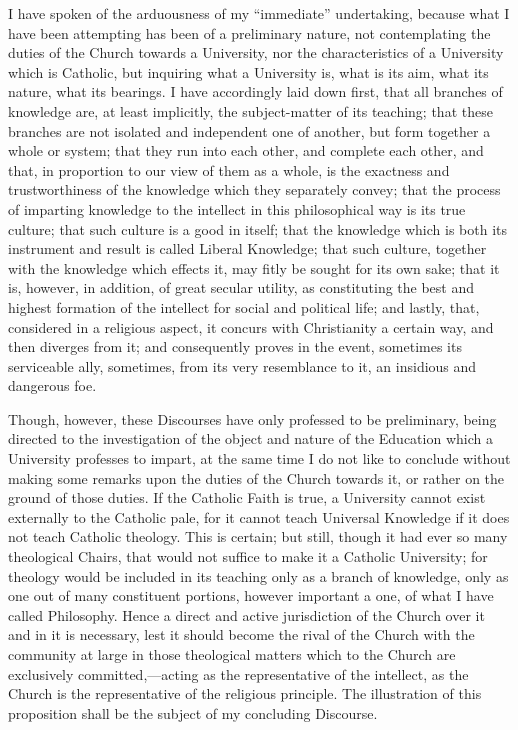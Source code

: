 I have spoken of the arduousness of my ``immediate''
undertaking, because what I have been attempting has been of a
preliminary nature, not contemplating the duties of the Church towards
a University, nor the characteristics of a University which is
Catholic, but inquiring what a University is, what is its aim, what
its nature, what its bearings. I have accordingly laid down first,
that all branches of knowledge are, at least implicitly, the
subject-matter of its teaching; that these branches are not isolated
and independent one of another, but form together a whole or system;
that they run into each other, and complete each other, and that, in
proportion to our view of them as a whole, is the exactness and
trustworthiness of the knowledge which they separately convey; that
the process of imparting knowledge to the intellect in this
philosophical way is its true culture; that such culture is a good in
itself; that the knowledge which is both its instrument and result is
called Liberal Knowledge; that such culture, together with the
knowledge which effects it, may fitly be sought for its own sake; that
it is, however, in addition, of great secular utility, as constituting
the best and highest formation of the intellect for social and
political life; and lastly, that, considered in a religious aspect, it
concurs with Christianity a certain way, and then diverges from it;
and consequently proves in the event, sometimes its serviceable ally,
sometimes, from its very resemblance to it, an insidious and dangerous
foe.

Though, however, these Discourses have only professed to be
preliminary, being directed to the investigation of the object and
nature of the Education which a University professes to impart, at the
same time I do not like to conclude without making some remarks upon
the duties of the Church towards it, or rather on the ground of those
duties. If the Catholic Faith is true, a University cannot exist
externally to the Catholic pale, for it cannot teach Universal
Knowledge if it does not teach Catholic theology. This is certain; but
still, though it had ever so many theological Chairs, that would
not suffice to make it a Catholic University; for theology would be
included in its teaching only as a branch of knowledge, only as one
out of many constituent portions, however important a one, of what I
have called Philosophy. Hence a direct and active jurisdiction of the
Church over it and in it is necessary, lest it should become the rival
of the Church with the community at large in those theological matters
which to the Church are exclusively committed,—acting as the
representative of the intellect, as the Church is the representative
of the religious principle. The illustration of this proposition shall
be the subject of my concluding Discourse.

